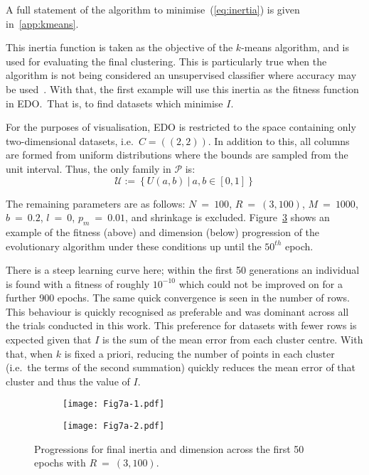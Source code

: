 A full statement of the algorithm to minimise~(\ref{eq:inertia}) is given
in~\ref{app:kmeans}.

This inertia function is taken as the objective of the \(k\)-means algorithm,
and is used for evaluating the final clustering. This is particularly true when
the algorithm is not being considered an unsupervised classifier where accuracy
may be used~\cite{Huang1998}. With that, the first example will use this inertia
as the fitness function in EDO.\ That is, to find datasets which minimise \(I\).

For the purposes of visualisation, EDO is restricted to the space containing
only two-dimensional datasets, i.e.\ \(C = \left((2, 2)\right)\). In addition to
this, all columns are formed from uniform distributions where the bounds are
sampled from the unit interval. Thus, the only family in \(\mathcal{P}\) is:
\begin{equation}
    \mathcal{U} := \left\{U(a, b)~|~a, b \in [0, 1]\right\}
\end{equation}

The remaining parameters are as follows: \(N~=~100\), \(R~=~(3, 100)\),
\(M~=~1000\), \(b~=~0.2\), \(l~=~0\), \(p_m~=~0.01\), and shrinkage is excluded.
Figure~\ref{fig:small-inertia-50} shows an example of the fitness (above) and
dimension (below) progression of the evolutionary algorithm under these
conditions up until the \(50^{th}\) epoch.

There is a steep learning curve here; within the first 50 generations an
individual is found with a fitness of roughly \(10^{-10}\) which could not be
improved on for a further 900 epochs. The same quick convergence is seen in the
number of rows. This behaviour is quickly recognised as preferable and was
dominant across all the trials conducted in this work. This preference for
datasets with fewer rows is expected given that \(I\) is the sum of the mean
error from each cluster centre. With that, when \(k\) is fixed a priori,
reducing the number of points in each cluster (i.e.\ the terms of the second
summation) quickly reduces the mean error of that cluster and thus the value of
\(I\).

\begin{figure}[htbp]
    \centering
    \begin{subfigure}{\imgwidth}
        \texttt{[image: Fig7a-1.pdf]}
        \caption{}\label{fig:edo:inertia:small:fitness}
    \end{subfigure}

    \begin{subfigure}{\imgwidth}
        \texttt{[image: Fig7a-2.pdf]}
        \caption{}\label{fig:edo:inertia:small:dimension}
    \end{subfigure}
    \caption{%
        Progressions for final inertia and dimension across the first 50
        epochs with \(R~=~(3,100)\).
    }\label{fig:small-inertia-50}
\end{figure}

